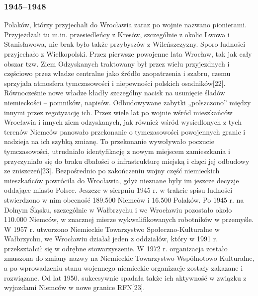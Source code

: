 \documentclass{article}
\begin{document}
\subsubsection{1945–1948}
\vspace{3mm} %
\newline Polaków, którzy przyjechali do Wrocławia zaraz po wojnie nazwano pionierami. Przyjeżdżali tu m.in. przesiedleńcy z Kresów, szczególnie z okolic Lwowa i Stanisławowa, nie brak było także przybyszów z Wileńszczyzny. Sporo ludności przyjechało z Wielkopolski. Przez pierwsze powojenne lata Wrocław, tak jak cały obszar tzw. Ziem Odzyskanych traktowany był przez wielu przyjezdnych i częściowo przez władze centralne jako źródło zaopatrzenia i szabru, czemu sprzyjała atmosfera tymczasowości i niepewności polskich osadników[22]. Równocześnie nowe władze kładły szczególny nacisk na usunięcie śladów niemieckości – pomników, napisów. Odbudowywane zabytki „polszczono” między innymi przez regotyzację ich.
\vspace{3mm} %
\newline Przez wiele lat po wojnie wśród mieszkańców Wrocławia i innych ziem odzyskanych, jak również wśród wysiedlonych z tych terenów Niemców panowało przekonanie o tymczasowości powojennych granic i nadzieja na ich szybką zmianę. To przekonanie wywoływało poczucie tymczasowości, utrudniało identyfikację z nowym miejscem zamieszkania i przyczyniało się do braku dbałości o infrastrukturę miejską i chęci jej odbudowy ze zniszczeń[23].
\vspace{3mm} %
\newline Bezpośrednio po zakończeniu wojny część niemieckich mieszkańców powróciła do Wrocławia, gdyż nieznane były im jeszcze decyzje oddające miasto Polsce. Jeszcze w sierpniu 1945 r. w trakcie spisu ludności stwierdzono w nim obecność 189.500 Niemców i 16.500 Polaków. Po 1945 r. na Dolnym Śląsku, szczególnie w Wałbrzychu i we Wrocławiu pozostało około 110.000 Niemców, w znacznej mierze wykwalifikowanych robotników w przemyśle. W 1957 r. utworzono Niemieckie Towarzystwo Społeczno-Kulturalne w Wałbrzychu, we Wrocławiu działał jeden z oddziałów, który w 1991 r. przekształcił się w odrębne stowarzyszenie. W 1972 r. organizacja zostało zmuszona do zmiany nazwy na Niemieckie Towarzystwo Wspólnotowo-Kulturalne, a po wprowadzeniu stanu wojennego niemieckie organizacje zostały zakazane i rozwiązane. Od lat 1950. sukcesywnie spadała także ich aktywność w związku z wyjazdami Niemców w nowe granice RFN[23].
\vspace{3mm} %
\end{document}
